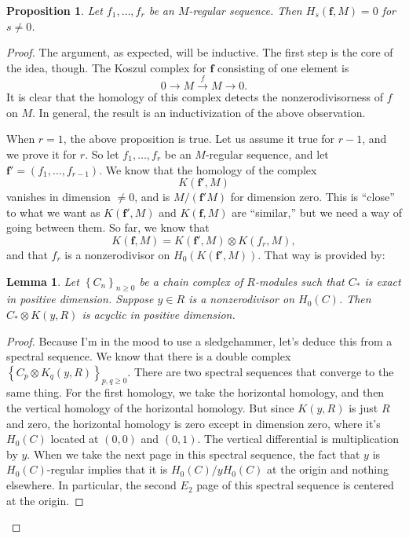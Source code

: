 \documentclass{article}
\newtheorem{lemma}{Lemma}
\newtheorem{proposition}{Proposition}
\begin{document}
\begin{proposition} 
Let $f_1, \dots, f_r$ be an $M$-regular sequence. Then $H_s(\mathbf{f}, M) = 0$
for $s \neq 0$.
\end{proposition} 
\begin{proof} 
The argument, as expected, will be inductive. The first step is the core of the
idea, though. The Koszul complex for $\mathbf{f}$ consisting of one element  is
\[ 0 \to M \stackrel{f}{\to} M \to 0.  \]
It is clear that the homology of this complex detects the nonzerodivisorness of
$f$ on $M$. In general, the result is an inductivization of the above
observation.

When $r=1$, the above proposition is true. Let us assume it true for $r-1$, and
we prove it for $r$. So let $f_1, \dots, f_r$ be an $M$-regular sequence, and
let $\mathbf{f}' = (f_1, \dots, f_{r-1})$. We
know that the homology of the complex
\[ K(\mathbf{f}', M)  \]
vanishes in dimension $\neq 0$, and is $M/(\mathbf{f}'M)$ for dimension zero.
This is ``close'' to what we want as $K(\mathbf{f}', M)$ and $K(\mathbf{f}, M)$
are ``similar,'' but we need a way of going between them.
So far, we know that 
\[ K(\mathbf{f}, M) = K(\mathbf{f}',M) \otimes K(f_r, M),  \]
and that $f_r$ is a nonzerodivisor on $H_0(K(\mathbf{f}', M))$.
That way is provided by:

\begin{lemma} 
Let $\left\{C_n\right\}_{n \geq 0}$ be a chain complex of $R$-modules such that $C_*$ is exact in
positive dimension. Suppose $y \in R$ is a nonzerodivisor on $H_0(C)$. 
Then $C_* \otimes K(y, R)$ is acyclic in positive dimension.
\end{lemma} 
\begin{proof} 
Because I'm in the mood to use a sledgehammer, let's deduce this from a
spectral sequence. We know that there is a double complex $\left\{C_p \otimes
K_q(y, R)\right\}_{p,q \geq 0}$. There are two spectral sequences that converge
to the same thing. For the first homology, we take the horizontal homology, and
then the vertical homology of the horizontal homology.  But since $K(y,R)$ is
just $R$ and zero, the horizontal homology is zero except in dimension zero,
where it's $H_0(C)$ located at $(0,0)$ and $(0,1)$. The vertical differential
is multiplication by $y$. When we take the next page in this spectral sequence,
the fact that $y$ is $H_0(C)$-regular implies that it is $H_0(C)/y H_0(C)$ at the origin
and nothing elsewhere. In particular, the second $E_2$ page of this spectral
sequence is centered at the origin.


\end{proof}
\end{proof}
\end{document}
